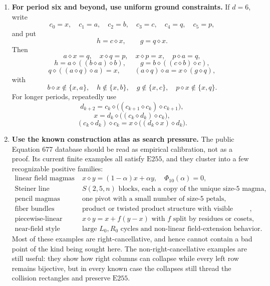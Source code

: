 \documentclass[12pt]{article}
\newcommand{\op}{\diamond}
\newcommand{\E}[1]{\mathrm{E#1}}
\theoremstyle{definition}
\begin{document}
\begin{enumerate}[label=\textbf{\arabic*.}]
If the right tail stays inside the principal orbit through $g$, then
$g\in\{a,q,p\}$.  The three internal branches begin as follows:
\[
\begin{array}{rcl}
g=q &\Longrightarrow& b\op q=a,
\quad (a\op q)\op a=(q\op q)\op q=q\backslash x,
\quad a\op q\ne q\op q,\vspace{1mm}\\
g=a &\Longrightarrow& b\op a=a,
\quad (q\op a)\op q=b\op x=a\backslash x,
\quad q\op a\ne b,\vspace{1mm}\\
g=p &\Longrightarrow& b\op p=a,
\quad q\op s=b,
\quad s\notin\{x,q\}.
\end{array} \tag{P5d}
\]
These branches are good places to apply the collision rectangle (C1) by hand.

\item \textbf{For period six and beyond, use uniform ground constraints.}
If $d=6$, write
\[
c_0=x,
\quad
c_1=a,
\quad
c_2=b,
\quad
c_3=c,
\quad
c_4=q,
\quad
c_5=p,
\]
and put
\[
h=c\op x,
\qquad
g=q\op x.
\]
Then
\[
a\op x=q,
\quad
x\op q=p,
\quad
x\op p=x,
\quad
p\op a=q, \tag{P6}
\]
\[
h=a\op((b\op a)\op b),
\qquad
g=b\op((c\op b)\op c), \tag{P6a}
\]
\[
q\op((a\op q)\op a)=x,
\qquad
(a\op q)\op a=x\op(g\op q), \tag{P6b}
\]
with
\[
b\op x\notin\{x,a\},
\quad
h\notin\{x,b\},
\quad
g\notin\{x,c\},
\quad
p\op x\notin\{x,q\}. \tag{P6c}
\]
For longer periods, repeatedly use
\[
d_{k+2}=c_k\op\bigl((c_{k+1}\op c_k)\op c_{k+1}\bigr), \tag{U1}
\]
\[
x=d_k\op\bigl((c_k\op d_k)\op c_k\bigr), \tag{U2}
\]
\[
(c_k\op d_k)\op c_k=x\op\bigl((d_k\op x)\op d_k\bigr). \tag{U3}
\]

\item \textbf{Use the known construction atlas as search pressure.}
The public Equation 677 database should be read as empirical calibration, not as a
proof.  Its current finite examples all satisfy $\E{255}$, and they cluster into a few
recognizable positive families:
\[
\begin{array}{ll}
\text{linear field magmas} & x\op y=(1-\alpha)x+\alpha y,\quad \Phi_{10}(\alpha)=0,\\
\text{Steiner line magmas} & S(2,5,n)\text{ blocks, each a copy of the unique size-5 magma},\\
\text{pencil magmas} & \text{one pivot with a small number of size-5 petals},\\
\text{fiber bundles} & \text{product or twisted product structure with visible fibers},\\
\text{piecewise-linear magmas} & x\op y=x+f(y-x)\text{ with }f\text{ split by residues or cosets},\\
\text{near-field style magmas} & \text{large }L_0,R_0\text{ cycles and non-linear field-extension behavior}.
\end{array}
\]
Most of these examples are right-cancellative, and hence cannot contain a bad point of
the kind being sought here.  The non-right-cancellative examples are still useful: they
show how right columns can collapse while every left row remains bijective, but in every
known case the collapses still thread the collision rectangles and preserve $\E{255}$.


\end{enumerate}
\end{document}
